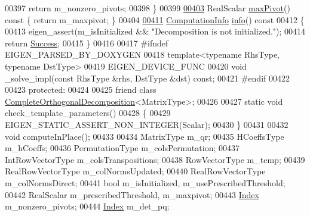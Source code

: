 \begin{DoxyCode}
00397       \textcolor{keywordflow}{return} m\_nonzero\_pivots;
00398     \}
00399 
\hyperlink{group___q_r___module_aac8c43d720170980f582d01494df9e8f}{00403}     RealScalar \hyperlink{group___q_r___module_aac8c43d720170980f582d01494df9e8f}{maxPivot}()\textcolor{keyword}{ const }\{ \textcolor{keywordflow}{return} m\_maxpivot; \}
00404 
\hyperlink{group___q_r___module_a5c756a789175197cab3eff3a3e479ef2}{00411}     \hyperlink{group__enums_ga85fad7b87587764e5cf6b513a9e0ee5e}{ComputationInfo} \hyperlink{group___q_r___module_a5c756a789175197cab3eff3a3e479ef2}{info}()\textcolor{keyword}{ const}
00412 \textcolor{keyword}{    }\{
00413       eigen\_assert(m\_isInitialized && \textcolor{stringliteral}{"Decomposition is not initialized."});
00414       \textcolor{keywordflow}{return} \hyperlink{group__enums_gga85fad7b87587764e5cf6b513a9e0ee5ea52581b035f4b59c203b8ff999ef5fcea}{Success};
00415     \}
00416 
00417 \textcolor{preprocessor}{    #ifndef EIGEN\_PARSED\_BY\_DOXYGEN}
00418     \textcolor{keyword}{template}<\textcolor{keyword}{typename} RhsType, \textcolor{keyword}{typename} DstType>
00419     EIGEN\_DEVICE\_FUNC
00420     \textcolor{keywordtype}{void} \_solve\_impl(\textcolor{keyword}{const} RhsType &rhs, DstType &dst) \textcolor{keyword}{const};
00421 \textcolor{preprocessor}{    #endif}
00422 
00423   \textcolor{keyword}{protected}:
00424 
00425     \textcolor{keyword}{friend} \textcolor{keyword}{class }\hyperlink{group___q_r___module_class_eigen_1_1_complete_orthogonal_decomposition}{CompleteOrthogonalDecomposition}<MatrixType>;
00426 
00427     \textcolor{keyword}{static} \textcolor{keywordtype}{void} check\_template\_parameters()
00428     \{
00429       EIGEN\_STATIC\_ASSERT\_NON\_INTEGER(Scalar);
00430     \}
00431 
00432     \textcolor{keywordtype}{void} computeInPlace();
00433 
00434     MatrixType m\_qr;
00435     HCoeffsType m\_hCoeffs;
00436     PermutationType m\_colsPermutation;
00437     IntRowVectorType m\_colsTranspositions;
00438     RowVectorType m\_temp;
00439     RealRowVectorType m\_colNormsUpdated;
00440     RealRowVectorType m\_colNormsDirect;
00441     \textcolor{keywordtype}{bool} m\_isInitialized, m\_usePrescribedThreshold;
00442     RealScalar m\_prescribedThreshold, m\_maxpivot;
00443     \hyperlink{namespace_eigen_a62e77e0933482dafde8fe197d9a2cfde}{Index} m\_nonzero\_pivots;
00444     \hyperlink{namespace_eigen_a62e77e0933482dafde8fe197d9a2cfde}{Index} m\_det\_pq;

\end{DoxyCode}
